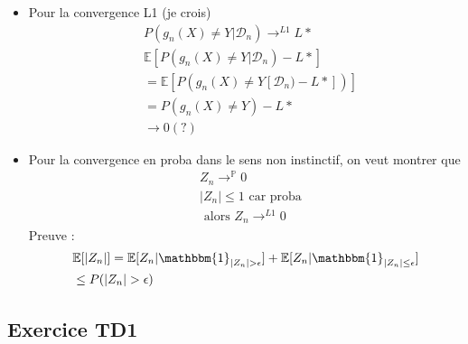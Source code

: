 \documentclass{article}
\theoremstyle{plain}%
\theoremstyle{definition}
\theoremstyle{remark}
\begin{document}
\begin{itemize}
    \item Pour la convergence L1 (je crois)
    \begin{align*}
        &P(g_n(X) \neq Y | \mathcal{D}_n) \to ^{L1} L* \\
        &\mathbb{E}[ P(g_n (X) \neq  Y | \mathcal{D} _n) - L*] \\
        &= \mathbb{E} [ P(g_n(X) \neq Y [ \mathcal{D}_n ) - L*])] \\
        &= P(g_n(X) \neq Y ) - L* \\
        & \to 0 (?)
    \end{align*}
    \item Pour la convergence en proba dans le sens non instinctif, on veut montrer que
    \begin{align*}
        &Z_n \to ^{\mathbb{P}} 0 \\
        &\left| Z_n \right|  \leq 1 \text{ car proba} \\
        &\text{ alors } Z_n \to ^{L1} 0
    \end{align*}
    Preuve : \begin{align*}
        &\mathbb{E} [ \left| Z_n \right| ] = \mathbb{E} [ Z_n  | \mathbbm{1}_{\left| Z_n \right| > \epsilon  }] + \mathbb{E} [ Z_n | \mathbbm{1}_{\left| Z_n \right| \leq \epsilon }] \\
        &\leq P(\left| Z_n \right| > \epsilon )
    \end{align*}
\end{itemize}


\subsection{Exercice TD1}
\end{document}
